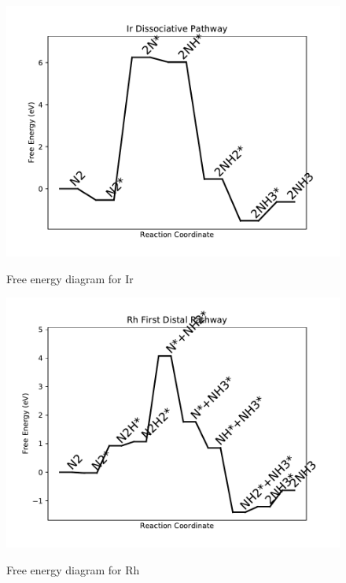 \documentclass{article}
\begin{document}
\begin{figure}
\includegraphics[width=1\linewidth]{data/plots/Ir_dissociative.pdf}
\label{fig:Ir_dissociative}
\caption{Free energy diagram for Ir}
\end{figure}

\begin{figure}
\includegraphics[width=1\linewidth]{data/plots/Rh_distal_1.pdf}
\label{fig:Rh_distal_1}
\caption{Free energy diagram for Rh}
\end{figure}
\end{document}
